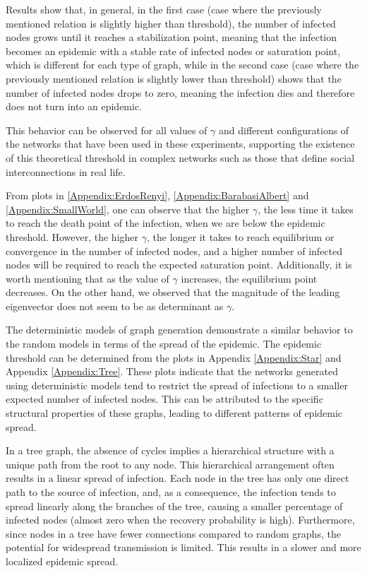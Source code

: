 Results show that, in general, in the first case (case where the previously mentioned relation is slightly higher than threshold), the number of infected nodes grows until it reaches a stabilization point, meaning that the infection becomes an epidemic with a stable rate of infected nodes or saturation point, which is different for each type of graph, while in the second case (case where the previously mentioned relation is slightly lower than threshold) shows that the number of infected nodes drops to zero, meaning the infection dies and therefore does not turn into an epidemic. 

This behavior can be observed for all values of $\gamma$ and different configurations of the networks that have been used in these experiments, supporting the existence of this theoretical threshold in complex networks such as those that define social interconnections in real life.

From plots in \ref{Appendix:ErdosRenyi}, \ref{Appendix:BarabasiAlbert} and \ref{Appendix:SmallWorld}, one can observe that the higher $\gamma$, the less time it takes to reach the death point of the infection, when we are below the epidemic threshold. However, the higher $\gamma$, the longer it takes to reach equilibrium or convergence in the number of infected nodes, and a higher number of infected nodes will be required to reach the expected saturation point. Additionally, it is worth mentioning that as the value of $\gamma$ increases, the equilibrium point decreases. On the other hand, we observed that the magnitude of the leading eigenvector does not seem to be as determinant as $\gamma$.

The deterministic models of graph generation demonstrate a similar behavior to the random models in terms of the spread of the epidemic. The epidemic threshold can be determined from the plots in Appendix \ref{Appendix:Star} and Appendix \ref{Appendix:Tree}. These plots indicate that the networks generated using deterministic models tend to restrict the spread of infections to a smaller expected number of infected nodes. This can be attributed to the specific structural properties of these graphs, leading to different patterns of epidemic spread. 

In a tree graph, the absence of cycles implies a hierarchical structure with a unique path from the root to any node. This hierarchical arrangement often results in a linear spread of infection. Each node in the tree has only one direct path to the source of infection, and, as a consequence, the infection tends to spread linearly along the branches of the tree, causing a smaller percentage of infected nodes (almost zero when the recovery probability is high). Furthermore, since nodes in a tree have fewer connections compared to random graphs, the potential for widespread transmission is limited. This results in a slower and more localized epidemic spread. 

